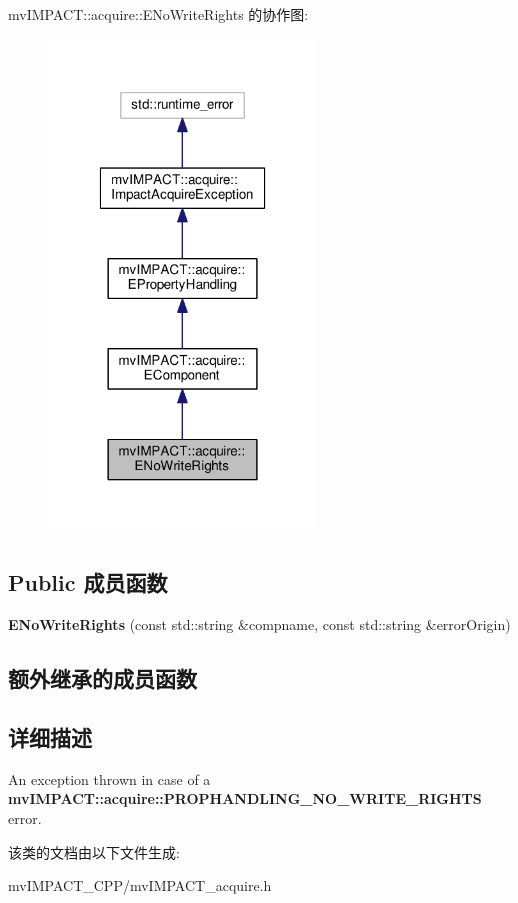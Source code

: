 mv\+I\+M\+P\+A\+C\+T\+:\+:acquire\+:\+:E\+No\+Write\+Rights 的协作图\+:
\nopagebreak
\begin{figure}[H]
\begin{center}
\leavevmode
\includegraphics[width=202pt]{classmv_i_m_p_a_c_t_1_1acquire_1_1_e_no_write_rights__coll__graph}
\end{center}
\end{figure}
\subsection*{Public 成员函数}
\begin{DoxyCompactItemize}
\item 
\hypertarget{classmv_i_m_p_a_c_t_1_1acquire_1_1_e_no_write_rights_ae80380666f3a375bdc6f7a0b9009847e}{{\bfseries E\+No\+Write\+Rights} (const std\+::string \&compname, const std\+::string \&error\+Origin)}\label{classmv_i_m_p_a_c_t_1_1acquire_1_1_e_no_write_rights_ae80380666f3a375bdc6f7a0b9009847e}

\end{DoxyCompactItemize}
\subsection*{额外继承的成员函数}


\subsection{详细描述}
An exception thrown in case of a {\bfseries mv\+I\+M\+P\+A\+C\+T\+::acquire\+::\+P\+R\+O\+P\+H\+A\+N\+D\+L\+I\+N\+G\+\_\+\+N\+O\+\_\+\+W\+R\+I\+T\+E\+\_\+\+R\+I\+G\+H\+T\+S} error. 

该类的文档由以下文件生成\+:\begin{DoxyCompactItemize}
\item 
mv\+I\+M\+P\+A\+C\+T\+\_\+\+C\+P\+P/mv\+I\+M\+P\+A\+C\+T\+\_\+acquire.\+h\end{DoxyCompactItemize}
